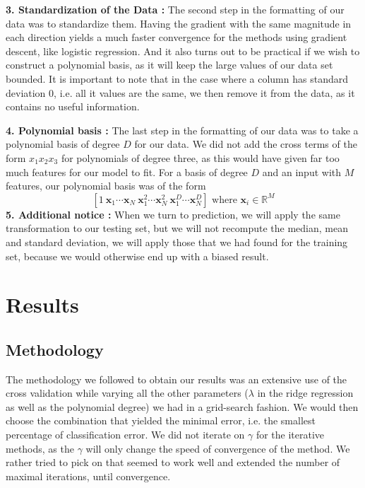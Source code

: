 \documentclass[10pt,conference,compsocconf]{IEEEtran}
\begin{document}
\textbf{3. Standardization of the Data :} The second step in the formatting of our data was to standardize them. Having the gradient with the same magnitude in each direction yields a much faster convergence for the methods using gradient descent, like logistic regression. And it also turns out to be practical if we wish to construct a polynomial basis, as it will keep the large values of our data set bounded. It is important to note that in the case where a column has standard deviation $0$, i.e. all it values are the same, we then remove it from the data, as it contains no useful information.

\textbf{4. Polynomial basis :} The last step in the formatting of our data was to take a polynomial basis of degree $D$ for our data. We did not add the cross terms of the form $x_1x_2x_3$ for polynomials of degree three, as this would have given far too much features for our model to fit. For a basis of degree $D$ and an input with $M$ features, our polynomial basis was of the form
\begin{equation}
\left[1 ~ \mathbf{x}_1 \cdots \mathbf{x}_N ~\mathbf{x}_1^2 \cdots \mathbf{x}_N^2 ~ \mathbf{x}_1^D \cdots \mathbf{x}_N^D \right] \mbox{ where } \mathbf{x}_i \in \mathbb{R}^M
\end{equation}
\textbf{5. Additional notice :} When we turn to prediction, we will apply the same transformation to our testing set, but we will not recompute the median, mean and standard deviation, we will apply those that we had found for the training set, because we would otherwise end up with a biased result.
\section{Results}
\subsection{Methodology}
The methodology we followed to obtain our results was an extensive use of the cross validation while varying all the other parameters ($\lambda$ in the ridge regression as well as the polynomial degree) we had in a grid-search fashion. We would then choose the combination that yielded the minimal error, i.e. the smallest percentage of classification error. We did not iterate on $\gamma$ for the iterative methods, as the $\gamma$ will only change the speed of convergence of the method. We rather tried to pick on that seemed to work well and extended the number of maximal iterations, until convergence. 
\end{document}
